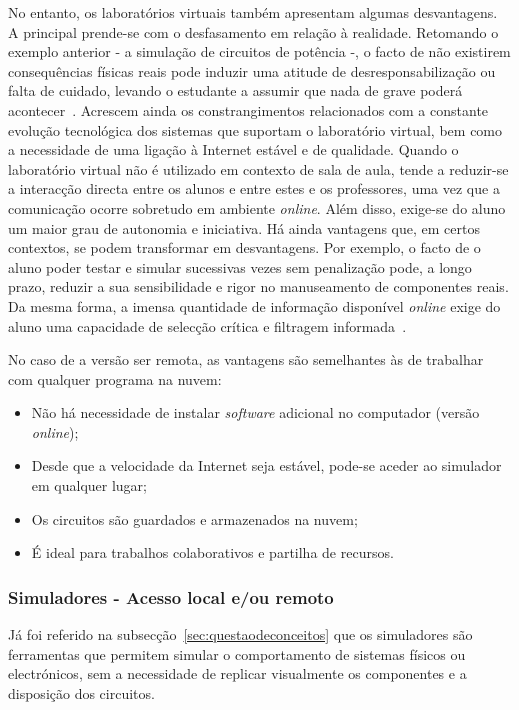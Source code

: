 No entanto, os laboratórios virtuais também apresentam algumas desvantagens. A principal prende-se com o desfasamento em relação à realidade. Retomando o exemplo anterior - a simulação de circuitos de potência -, o facto de não existirem consequências físicas reais pode induzir uma atitude de desresponsabilização ou falta de cuidado, levando o estudante a assumir que nada de grave poderá acontecer~\cite{POTKONJAK2016309}. Acrescem ainda os constrangimentos relacionados com a constante evolução tecnológica dos sistemas que suportam o laboratório virtual, bem como a necessidade de uma ligação à Internet estável e de qualidade. Quando o laboratório virtual não é utilizado em contexto de sala de aula, tende a reduzir-se a interacção directa entre os alunos e entre estes e os professores, uma vez que a comunicação ocorre sobretudo em ambiente \textit{online}. Além disso, exige-se do aluno um maior grau de autonomia e iniciativa. Há ainda vantagens que, em certos contextos, se podem transformar em desvantagens. Por exemplo, o facto de o aluno poder testar e simular sucessivas vezes sem penalização pode, a longo prazo, reduzir a sua sensibilidade e rigor no manuseamento de componentes reais. Da mesma forma, a imensa quantidade de informação disponível \textit{online} exige do aluno uma capacidade de selecção crítica e filtragem informada~\cite{POTKONJAK2016309, vabtegensVL, Gherasim, Ghergulescu2019Feb}.

No caso de a versão ser remota, as vantagens são semelhantes às de trabalhar com qualquer programa na nuvem:
\begin{itemize}
    \item Não há necessidade de instalar \textit{software} adicional no computador (versão \textit{online});
    \item Desde que a velocidade da Internet seja estável, pode-se aceder ao simulador em qualquer lugar;
    \item Os circuitos são guardados e armazenados na nuvem;
    \item É ideal para trabalhos colaborativos e partilha de recursos.
\end{itemize}

\subsubsection{Simuladores - Acesso local e/ou remoto}
Já foi referido na subsecção~\ref{sec:questaodeconceitos} que os simuladores são ferramentas que permitem simular o comportamento de sistemas físicos ou electrónicos, sem a necessidade de replicar visualmente os componentes e a disposição dos circuitos. 

